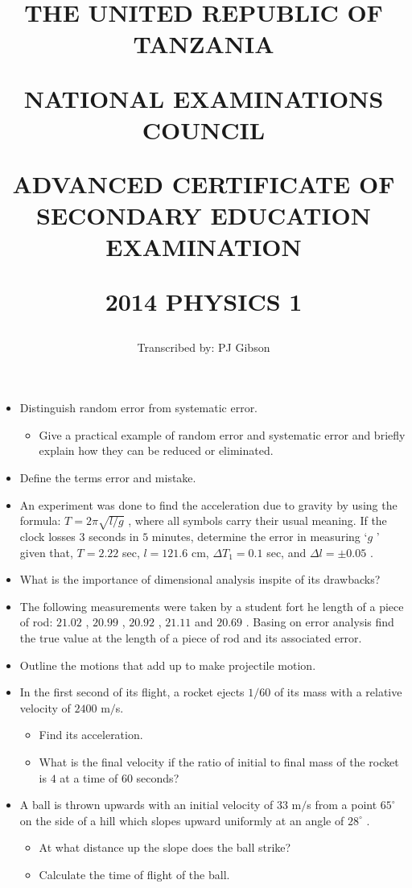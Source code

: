 \documentclass{article}
\title{THE UNITED REPUBLIC OF TANZANIA

NATIONAL EXAMINATIONS COUNCIL

ADVANCED CERTIFICATE OF SECONDARY EDUCATION EXAMINATION

\textbf{2014 PHYSICS 1}}
\author{Transcribed by:  PJ Gibson}
\begin{document}
\maketitle

\begin{itemize}
\item Distinguish random error from systematic error.
 \begin{itemize}
\item Give a practical example of random error and systematic error and briefly explain how they can be reduced or eliminated.
\end{itemize}
\item Define the terms error and mistake.
\item An experiment was done to find the acceleration due to gravity by using the formula: $ T=2\pi\sqrt{l/g}$ , where all symbols carry their usual meaning.  If the clock losses $ 3$ seconds in $ 5$ minutes, determine the error in measuring ‘$ g$ ’ given that, $ T=2.22$ sec, $ l=121.6$ cm, $ \Delta T_{1}=0.1$ sec, and  $ \Delta l=\pm 0.05$ .
\item What is the importance of dimensional analysis inspite of its drawbacks?
\item The following measurements were taken by a student fort he length of a piece of rod: $ 21.02$ , $ 20.99$ , $ 20.92$ , $ 21.11$ and $ 20.69$ . Basing on error analysis find the true value at the length of a piece of rod and its associated error.
\item Outline the motions that add up to make projectile motion. 
\item In the first second of its flight, a rocket ejects $ 1/60$ of  its mass with a relative velocity of $ 2400$ m$/$s.
 \begin{itemize}
\item Find its acceleration.
\item What is the final velocity if the ratio of initial to final mass of the rocket is $ 4$ at a time of $ 60$ seconds? 
\end{itemize}
\item A ball is thrown upwards with an initial velocity of $ 33$ m$/$s from a point $ 65^{\circ}$ on the side of a hill which slopes upward uniformly at an angle of $ 28^{\circ}$ .
 \begin{itemize}
\item At what distance up the slope does the ball strike?
\item Calculate the time of flight of the ball. 
\end{itemize}

\end{itemize}
\end{document}
